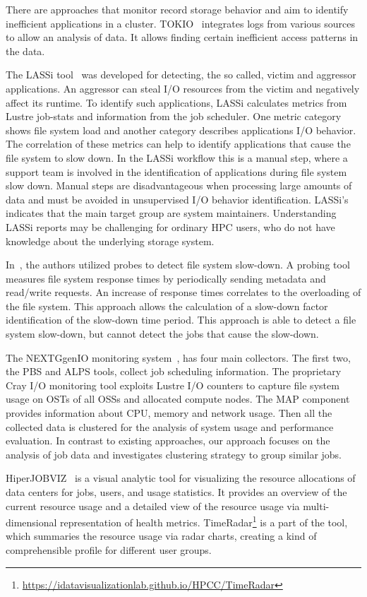 \documentclass{jhps}
\begin{document}
There are approaches that monitor record storage behavior and aim to identify inefficient applications in a cluster.
TOKIO~\cite{lockwood2018tokio} integrates logs from various sources to allow an analysis of data.
It allows finding certain inefficient access patterns in the data.

The LASSi tool~\cite{DBLP:journals/corr/abs-1906-03884} was developed for detecting, the so called, victim and aggressor applications.
An aggressor can steal I/O resources from the victim and negatively affect its runtime.
To identify such applications, LASSi calculates metrics from Lustre job-stats and information from the job scheduler.
One metric category shows file system load and another category describes applications I/O behavior.
The correlation of these metrics can help to identify applications that cause the file system to slow down.
In the LASSi workflow this is a manual step, where a support team is involved in the identification of applications during file system slow down.
Manual steps are disadvantageous when processing large amounts of data and must be avoided in unsupervised I/O behavior identification.
LASSi's indicates that the main target group are system maintainers.
Understanding LASSi reports may be challenging for ordinary HPC users, who do not have knowledge about the underlying storage system.


In~\cite{TUISVPKB19}, the authors utilized probes to detect file system slow-down.
A probing tool measures file system response times by periodically sending metadata and read/write requests.
An increase of response times correlates to the overloading of the file system.
This approach allows the calculation of a slow-down factor identification of the slow-down time period.
This approach is able to detect a file system slow-down, but cannot detect the jobs that cause the slow-down.

The NEXTGgenIO monitoring system~\cite{nextgenio2016}, has four main collectors.
The first two, the PBS and ALPS tools, collect job scheduling information.
The proprietary Cray I/O monitoring tool exploits Lustre I/O counters to capture file system usage on OSTs of all OSSs and allocated compute nodes.
The MAP component provides information about CPU, memory and network usage.
Then all the collected data is clustered for the analysis of system usage and performance evaluation.
In contrast to existing approaches, our approach focuses on the analysis of job data and investigates clustering strategy to group similar jobs.


HiperJOBVIZ~\cite{hiperjobviz2019} is a visual analytic tool for visualizing the resource allocations of data centers for jobs, users, and usage statistics.
It provides an overview of the current resource usage and a detailed view of the resource usage via multi-dimensional representation of health metrics.
TimeRadar\footnote{\url{https://idatavisualizationlab.github.io/HPCC/TimeRadar}} is a part of the tool, which summaries the resource usage via radar charts, creating a kind of comprehensible profile for different user groups.
\end{document}
